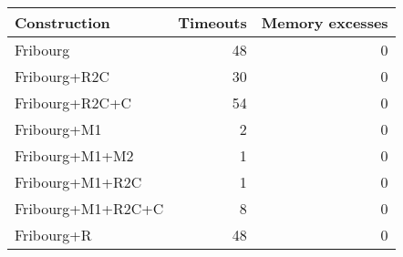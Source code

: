 \begin{tabular}{lrr}
  \hline
Construction & Timeouts & Memory excesses \\ 
  \hline
Fribourg & 48 & 0 \\ 
  Fribourg+R2C & 30 & 0 \\ 
  Fribourg+R2C+C & 54 & 0 \\ 
  Fribourg+M1 & 2 & 0 \\ 
  Fribourg+M1+M2 & 1 & 0 \\ 
  Fribourg+M1+R2C & 1 & 0 \\ 
  Fribourg+M1+R2C+C & 8 & 0 \\ 
  Fribourg+R & 48 & 0 \\ 
   \hline
\end{tabular}
